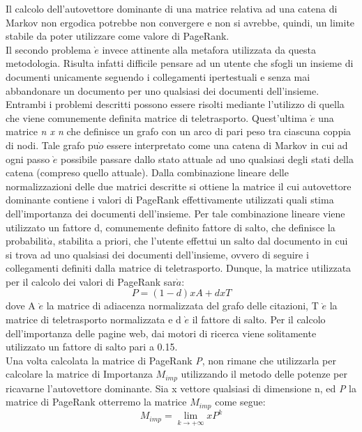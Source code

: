 Il calcolo dell'autovettore dominante di una matrice relativa ad una catena di
Markov non ergodica potrebbe non convergere e non si avrebbe, quindi, un
limite stabile da poter utilizzare come valore di PageRank.\\
Il secondo problema $\grave{e}$ invece attinente alla metafora utilizzata da questa
metodologia. Risulta infatti difficile pensare ad un utente che sfogli un insieme
di documenti unicamente seguendo i collegamenti ipertestuali e senza
mai abbandonare un documento per uno qualsiasi dei documenti dell'insieme.
Entrambi i problemi descritti possono essere risolti mediante l'utilizzo di
quella che viene comunemente definita matrice di teletrasporto. Quest'ultima
$\grave{e}$ una matrice \textit{n x n} che definisce un grafo con un arco di pari peso tra ciascuna
coppia di nodi. Tale grafo pu$\grave{o}$ essere interpretato come una catena di Markov
in cui ad ogni passo $\grave{e}$ possibile passare dallo stato attuale ad uno qualsiasi
degli stati della catena (compreso quello attuale). Dalla combinazione lineare
delle normalizzazioni delle due matrici descritte si ottiene la matrice il cui
autovettore dominante contiene i valori di PageRank effettivamente utilizzati
quali stima dell'importanza dei documenti dell'insieme. Per tale combinazione
lineare viene utilizzato un fattore d, comunemente definito fattore di salto,
che definisce la probabilit$\grave{a}$, stabilita a priori, che l'utente effettui un salto dal
documento in cui si trova ad uno qualsiasi dei documenti dell'insieme, ovvero
di seguire i collegamenti definiti dalla matrice di teletrasporto. Dunque, la
matrice utilizzata per il calcolo dei valori di PageRank sar$\grave{a}$:
\begin{equation}
P = (1 - d) x A + d x T
\end{equation}
dove A $\grave{e}$ la matrice di adiacenza normalizzata del grafo delle citazioni, T $\grave{e}$
la matrice di teletrasporto normalizzata e d $\grave{e}$ il fattore di salto. Per il calcolo
dell'importanza delle pagine web, dai motori di ricerca viene solitamente
utilizzato un fattore di salto pari a 0.15.\\
Una volta calcolata la matrice di PageRank \textit{P}, non rimane che utilizzarla
per calcolare la matrice di Importanza $M_{imp}$ utilizzando il metodo delle potenze
per ricavarne l'autovettore dominante. Sia x vettore qualsiasi di dimensione n,
ed \textit{P} la matrice di PageRank otterremo la matrice $M_{imp}$ come segue:
\begin{equation}
M_{imp} = \lim_{k \rightarrow +\infty} x P^{k}
\end{equation}
